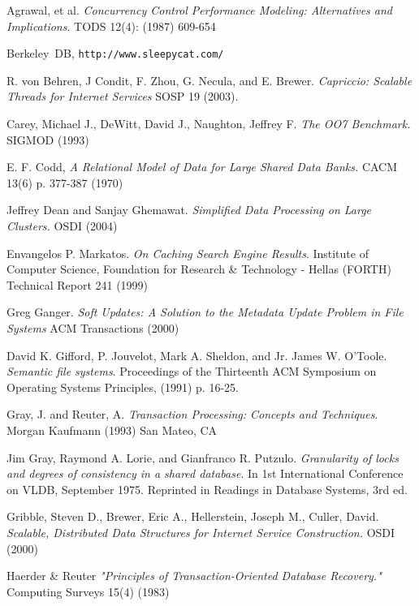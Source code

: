 \documentclass[10pt,letterpaper,twocolumn,english]{article}
\begin{document}
\begin{thebibliography}{99}
\begin{small}
 Agrawal, et al. {\em Concurrency
Control Performance Modeling: Alternatives and Implications}. TODS
12(4): (1987) 609-654

 Berkeley~DB, {\tt http://www.sleepycat.com/}

 R. von Behren, J Condit, F. Zhou, G. Necula, and E. Brewer. {\em Capriccio: Scalable Threads for Internet Services} SOSP 19 (2003).

 Carey, Michael J., DeWitt, David J., Naughton, Jeffrey F. {\em The OO7 Benchmark.} SIGMOD (1993)

 E. F. Codd, {\em A Relational Model of Data for Large Shared Data Banks.} CACM 13(6) p. 377-387 (1970)

 Jeffrey Dean and Sanjay Ghemawat. {\em Simplified Data Processing on Large Clusters. } OSDI (2004)

 Envangelos P. Markatos. {\em On Caching Search Engine Results}.  Institute of Computer Science, Foundation for Research \& Technology - Hellas (FORTH) Technical Report 241 (1999)

 Greg Ganger.  {\em Soft Updates: A Solution to the Metadata Update Problem in File Systems } ACM Transactions (2000)

 David K. Gifford, P. Jouvelot, Mark A. Sheldon, and Jr. James W. O'Toole. {\em Semantic file systems}. Proceedings of the Thirteenth ACM Symposium on Operating Systems Principles, (1991) p. 16-25.

 Gray, J. and Reuter, A. {\em Transaction Processing: Concepts and Techniques}. Morgan Kaufmann (1993) San Mateo, CA

 Jim Gray, Raymond A. Lorie, and Gianfranco R. Putzulo. {\em Granularity of locks and degrees of consistency in a shared database}. In 1st International Conference on VLDB, September 1975. Reprinted in Readings in Database Systems, 3rd ed.

  Gribble, Steven D., Brewer, Eric A., Hellerstein, Joseph M., Culler, David.  {\em Scalable, Distributed Data Structures for Internet Service Construction. } OSDI (2000)

 Haerder \& Reuter {\em "Principles of Transaction-Oriented Database Recovery." } Computing Surveys 15(4) (1983) %


\end{small}
\end{thebibliography}
\end{document}
